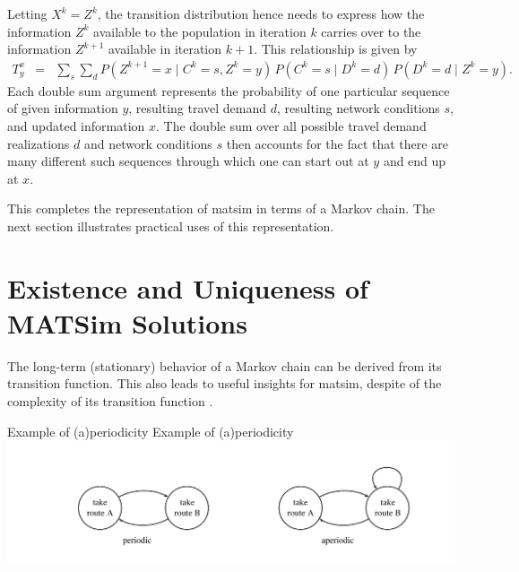 Letting $X^{k}=Z^{k}$, the transition distribution hence needs to
express how the information $Z^{k}$ available to the population in
iteration $k$ carries over to the information $Z^{k+1}$ 
available in iteration $k+1$. This relationship is given by
\begin{eqnarray}
T_{y}^{x} & = & \sum_{s}\sum_{d}
%
P(Z^{k+1}\!=\!x\mid C^{k}\!=\!s,Z^{k}\!=\!y)
\, P(C^{k}\!=\!s\mid D^{k}\!=\!d) 
\, P(D^{k}\!=\!d\mid Z^{k}\!=\!y) .\label{eq:matsim-transition-distr}
\end{eqnarray}
Each double sum argument represents the probability of one
particular 
{sequence of given information $y$, resulting travel demand
$d$, resulting network conditions $s$, and updated information $x$}.
The double sum over all possible travel demand realizations $d$ and
network conditions $s$ then accounts for the fact that there are
many different such sequences through which one can start out at $y$
and end up at $x$.

This completes the representation of \gls{matsim} in terms of a Markov chain.
The next section illustrates practical uses of this representation.


\section{\label{sec:Existence-and-uniqueness}Existence and Uniqueness of
MATSim Solutions}

The long-term (stationary) behavior of a Markov chain can be derived
from its transition function. This also leads to useful insights for
 \gls{matsim}, despite of the complexity of its transition function
.

\createfigure%
{Example of (a)periodicity}%
{Example of (a)periodicity}%
{\label{fig:Example-of-(a)periodicity}}%
{\includegraphics[width=0.99\textwidth, angle=0]{understanding/figures/mc/fig1.pdf}}%
{}

